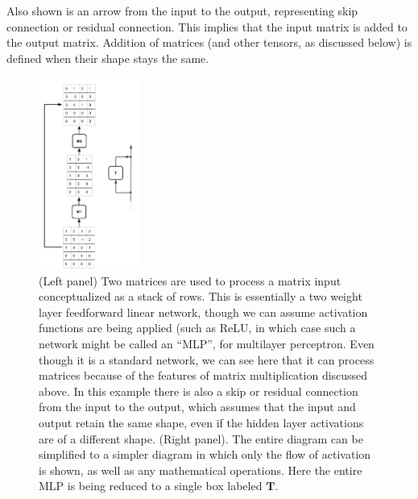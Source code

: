 Also shown is an arrow from the input to the output, representing skip connection or residual connection. This implies that the input matrix is added to the output matrix. Addition of matrices (and other tensors, as discussed below) is defined when their shape stays the same. 

\begin{figure}[h]
\centering
\includegraphics[width=0.3\textwidth]{images/flowPerspective.png}
\caption[Jeff Yoshimi.]{(Left panel) Two matrices are used to process a matrix input conceptualized as a stack of rows. This is essentially a two weight layer feedforward linear network, though we can assume activation functions are being applied (such as ReLU, in which case such a network might be called an ``MLP'', for multilayer perceptron. Even though it is a standard network, we can see here that it can process matrices because of the features of matrix multiplication discussed above. In this example there is also a skip or residual connection from the input to the output, which assumes that the input and output retain the same shape, even if the hidden layer activations are of a different shape. (Right panel). The entire diagram can be simplified to a simpler diagram in which only the flow of activation is shown, as well as any mathematical operations. Here the entire MLP is being reduced to a single box labeled  $\mathbf{T}$. }
\label{flowPerspective}
\end{figure} 

